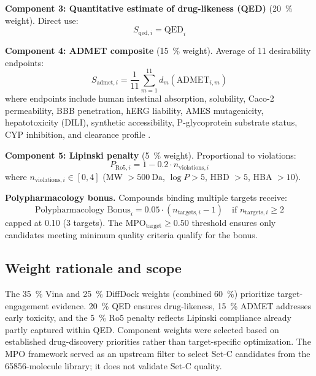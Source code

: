 \documentclass[11pt,a4paper]{article}
\begin{document}
	\textbf{Component 3: Quantitative estimate of drug-likeness (QED)} (\qty{20}{\percent} weight). Direct use:
	\begin{equation}
		S_{\text{qed}, i} = \text{QED}_i
		\label{eq:sm_qed}
	\end{equation}
	
	\textbf{Component 4: ADMET composite} (\qty{15}{\percent} weight). Average of 11 desirability endpoints:
	\begin{equation}
		S_{\text{admet}, i} = \frac{1}{11} \sum_{m=1}^{11} d_m(\text{ADMET}_{i,m})
		\label{eq:sm_admet}
	\end{equation}
	where endpoints include human intestinal absorption, solubility, Caco-2 permeability, BBB penetration, hERG liability, AMES mutagenicity, hepatotoxicity (DILI), synthetic accessibility, P-glycoprotein substrate status, CYP inhibition, and clearance profile \cite{Swanson2024}.
	
	\textbf{Component 5: Lipinski penalty} (\qty{5}{\percent} weight). Proportional to violations:
	\begin{equation}
		P_{\text{Ro5}, i} = 1 - 0.2 \cdot n_{\text{violations}, i}
		\label{eq:sm_ro5}
	\end{equation}
	where $n_{\text{violations}, i} \in [0,4]$ (MW $> \qty{500}{\dalton}$, $\log P > \num{5}$, HBD $> \num{5}$, HBA $> \num{10}$).
	
	\textbf{Polypharmacology bonus.} Compounds binding multiple targets receive:
	\begin{equation}
		\text{Polypharmacology Bonus}_i = 0.05 \cdot (n_{\text{targets}, i} - 1) \quad \text{if } n_{\text{targets}, i} \geq 2
		\label{eq:sm_poly}
	\end{equation}
	capped at \num{+0.10} (3 targets). The $\text{MPO}_{\text{target}} \geq \num{0.50}$ threshold ensures only candidates meeting minimum quality criteria qualify for the bonus.
	
	\subsection{Weight rationale and scope}\label{sec:sm_mpo_weights}
	The \qty{35}{\percent} Vina and \qty{25}{\percent} DiffDock weights (combined \qty{60}{\percent}) prioritize target-engagement evidence. \qty{20}{\percent} QED ensures drug-likeness, \qty{15}{\percent} ADMET addresses early toxicity, and the \qty{5}{\percent} Ro5 penalty reflects Lipinski compliance already partly captured within QED. Component weights were selected based on established drug-discovery priorities \cite{Hughes2008,Gleeson2008,Lipinski2004} rather than target-specific optimization. The MPO framework served as an upstream filter to select Set-C candidates from the \num{65856}-molecule library; it does not validate Set-C quality.
	
\end{document}
